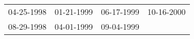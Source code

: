 \begin{supertabular}{llll}
 04-25-1998 &  01-21-1999 &  06-17-1999 &  10-16-2000 \\
 08-29-1998 &  04-01-1999 &  09-04-1999 &             \\
\end{supertabular}
